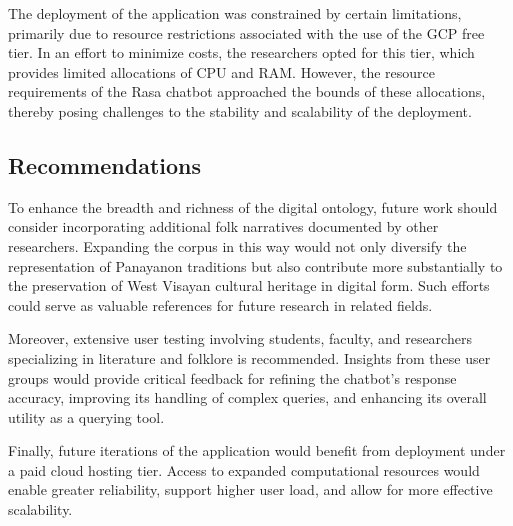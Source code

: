    The deployment of the application was constrained by certain limitations, primarily due to resource restrictions associated with the use of the GCP free tier. In an effort to minimize costs, the researchers opted for this tier, which provides limited allocations of CPU and RAM. However, the resource requirements of the Rasa chatbot approached the bounds of these allocations, thereby posing challenges to the stability and scalability of the deployment.
    
\subsection{Recommendations}
    To enhance the breadth and richness of the digital ontology, future work should consider incorporating additional folk narratives documented by other researchers. Expanding the corpus in this way would not only diversify the representation of Panayanon traditions but also contribute more substantially to the preservation of West Visayan cultural heritage in digital form. Such efforts could serve as valuable references for future research in related fields.
    
    Moreover, extensive user testing involving students, faculty, and researchers specializing in literature and folklore is recommended. Insights from these user groups would provide critical feedback for refining the chatbot’s response accuracy, improving its handling of complex queries, and enhancing its overall utility as a querying tool.
    
    Finally, future iterations of the application would benefit from deployment under a paid cloud hosting tier. Access to expanded computational resources would enable greater reliability, support higher user load, and allow for more effective scalability.

\FloatBarrier